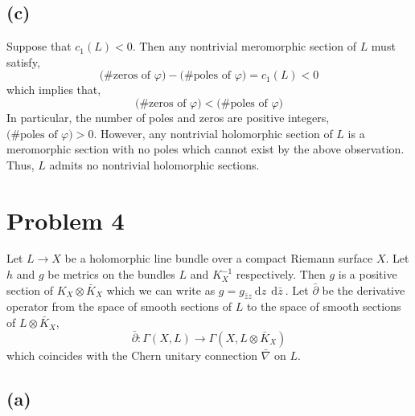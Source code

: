 \documentclass[12pt]{extarticle}
\renewcommand{\d}[1]{\: \mathrm{d}#1 \:}
\theoremstyle{definition}
\begin{document}
\subsection*{(c)}

Suppose that $c_1(L) < 0$. Then any nontrivial meromorphic section of $L$ must satisfy,
\[ \text{(\# zeros of $\varphi$)} - \text{(\# poles of $\varphi$)} = c_1(L) < 0 \]
which implies that,
\[ \text{(\# zeros of $\varphi$)} < \text{(\# poles of $\varphi$)} \]
In particular, the number of poles and zeros are positive integers, $\text{(\# poles of $\varphi$)} > 0$. However, any nontrivial holomorphic section of $L$ is a meromorphic section with no poles which cannot exist by the above observation. Thus, $L$ admits no nontrivial holomorphic sections.

\section*{Problem 4}

Let $L \to X$ be a holomorphic line bundle over a compact Riemann surface $X$. Let $h$ and $g$ be metrics on the bundles $L$ and $K_X^{-1}$ respectively. Then $g$ is a positive section of $K_X \otimes \bar{K}_X$ which we can write as $g = g_{\bar{z} z} \d{z} \d{\bar{z}}$. Let $\bar{\partial}$ be the derivative operator from the space of smooth sections of $L$ to the space of smooth sections of $L \otimes \bar{K}_X$,
\[ \bar{\partial} : \Gamma(X, L) \to \Gamma(X, L \otimes \bar{K}_X) \]
which coincides with the Chern unitary connection $\bar{\nabla}$ on $L$. 

\subsection*{(a)}
\end{document}

